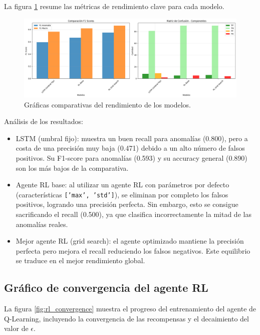 \documentclass[12pt]{article}
\begin{document}
La figura \ref{fig:comparacion_modelos} resume las métricas de rendimiento clave para cada modelo.

\begin{figure}[H]
\centering
\includegraphics[width=1\textwidth]{media/metrics_comparison.png}
\caption{Gráficas comparativas del rendimiento de los modelos.}
\label{fig:comparacion_modelos}
\end{figure}

Análisis de los resultados:

\begin{itemize}
    \item LSTM (umbral fijo): muestra un buen recall para anomalías (0.800), pero a costa de una precisión muy baja (0.471) debido a un alto número de falsos positivos. Su F1-score para anomalías (0.593) y su accuracy general (0.890) son los más bajos de la comparativa.
    \item Agente RL base: al utilizar un agente RL con parámetros por defecto (características \texttt{['max', 'std']}), se eliminan por completo los falsos positivos, logrando una precisión perfecta. Sin embargo, esto se consigue sacrificando el recall (0.500), ya que clasifica incorrectamente la mitad de las anomalías reales.
    \item Mejor agente RL (grid search): el agente optimizado mantiene la precisión perfecta pero mejora el recall reduciendo los falsos negativos. Este equilibrio se traduce en el mejor rendimiento global.
\end{itemize}

\subsection{Gráfico de convergencia del agente RL}
La figura \ref{fig:rl_convergence} muestra el progreso del entrenamiento del agente de Q-Learning, incluyendo la convergencia de las recompensas y el decaimiento del valor de $\epsilon$.
\end{document}
